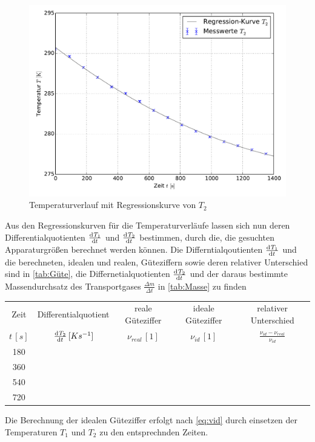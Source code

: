 \begin{figure}
	\centering
	\includegraphics[scale=0.75]{Plots/Temperaturverlauf_T2.pdf}
	\caption{Temperaturverlauf mit Regressionskurve von $T_{2}$}
	\label{fig:T2}
\end{figure}

Aus den Regressionskurven für die Temperaturverläufe lassen sich nun deren Differentialquotienten $\od{T_{1}}{t}$ und $\tod{T_{2}}{t}$
bestimmen, durch die, die gesuchten Apparaturgrößen berechnet werden können. Die Differntialqoutienten $\od{T_{1}}{t}$ und die 
berechneten, idealen und realen, Güteziffern sowie deren relativer Unterschied sind in \autoref{tab:Güte}, die 
Differnetialquotienten $\od{T_{2}}{t}$ und der daraus bestimmte Massendurchsatz des Transportgases $\tfrac{\Delta m}{\Delta t}$
in \autoref{tab:Masse} zu finden
 	

\begin{table}
	\begin{tabular}{|c|c|c|c|c|}
		\hline
		Zeit& Differentialquotient& reale Güteziffer& ideale Güteziffer& relativer Unterschied\\
		$t\,[\si{s}]$& $\od{T_{2}}{t}\,[Ks^{-1}]$&$ \nu_{real}\,[1]$ & $\nu_{id}\,[1]$& $\frac{\nu_{id} - \nu_{real}}{\nu_{id}}$ \\ \hline \hline
		180& &&&\\
		360&&&&\\
		540&&&&\\
		720&&&&\\
		\hline
	\end{tabular}
\end{table}

Die Berechnung der idealen Güteziffer erfolgt nach \eqref{eq:vid} durch einsetzen der Temperaturen $T_{1}$ und $T_{2}$ zu den entsprechnden
Zeiten.

